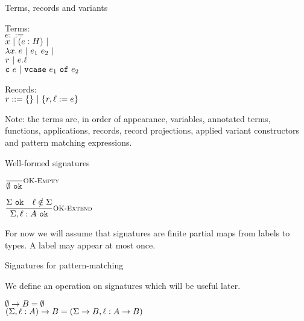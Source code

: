\documentclass{beamer}
\begin{document}
\begin{frame}{Terms, records and variants}

Terms: \\
$e ::=$ \\
\qquad $x \pipe \annot{e}{H} \pipe$ \\
\qquad $\fun{x}{e} \pipe \app{e_1}{e_2} \pipe$ \\
\qquad $r \pipe \proj{e}{\ell}$ \\
\qquad $\cons{\texttt{c}}{e} \pipe \vcase{e_1}{e_2}$

\vspace{2em}

Records: \\
$r ::= \emptyrecord \pipe \extendrecord{r}{\ell}{e}$ \\

\vspace{2em}

Note: the terms are, in order of appearance, variables, annotated terms, functions, applications, records, record projections, applied variant constructors and pattern matching expressions.

\end{frame}

\begin{frame}{Well-formed signatures}

\begin{center}
  $\infrule[OK-Empty]{}{\sigok{\emptysig}}$

  \vspace{2em}

  $\infrule[OK-Extend]{\sigok{\Sigma} \quad \sidecond{\ell \notin \Sigma}}{\sigok{\extendsig{\Sigma}{\ell}{A}}}$
\end{center}

\vspace{2em}

For now we will assume that signatures are finite partial maps from labels to types. A label may appear at most once.

\end{frame}

\begin{frame}{Signatures for pattern-matching}

We define an operation on signatures which will be useful later.

\vspace{2em}

$\funsig{\emptysig}{B} = \emptysig$ \\
$\funsig{(\extendsig{\Sigma}{\ell}{A})}{B} = (\extendsig{\funsig{\Sigma}{B}}{\ell}{\Fun{A}{B}})$

\end{frame}
\end{document}
